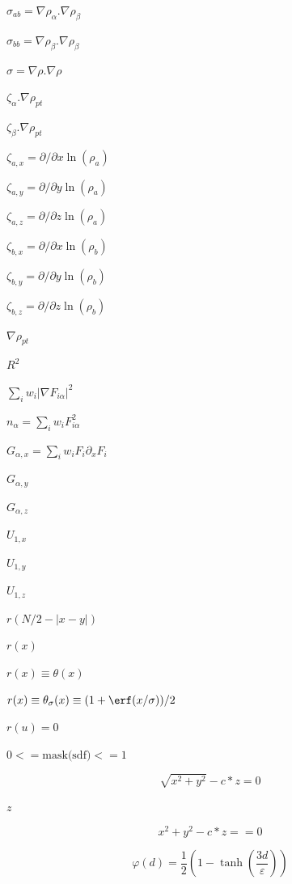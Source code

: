 \documentclass{article}
\begin{document}
$ \sigma_{ab} = \nabla \rho_{\alpha}.\nabla \rho_{\beta} $
\pagebreak

$ \sigma_{bb} = \nabla \rho_{\beta}.\nabla \rho_{\beta} $
\pagebreak

$ \sigma = \nabla \rho.\nabla \rho $
\pagebreak

$ \zeta_{\alpha}.\nabla\rho_{pt} $
\pagebreak

$ \zeta_{\beta}.\nabla\rho_{pt} $
\pagebreak

$ \zeta_{a,x}=\partial/{\partial x} \ln(\rho_a)  $
\pagebreak

$ \zeta_{a,y}=\partial/{\partial y} \ln(\rho_a)  $
\pagebreak

$ \zeta_{a,z}=\partial/{\partial z} \ln(\rho_a)  $
\pagebreak

$ \zeta_{b,x} = \partial/{\partial x} \ln(\rho_b)  $
\pagebreak

$ \zeta_{b,y} = \partial/{\partial y} \ln(\rho_b)  $
\pagebreak

$ \zeta_{b,z} = \partial/{\partial z} \ln(\rho_b)  $
\pagebreak

$ \nabla\rho_{pt}$
\pagebreak

$ R^2 $
\pagebreak

$ \sum_i w_i|\nabla F_{i\alpha}|^2 $
\pagebreak

$ n_\alpha=\sum_i w_iF_{i\alpha}^2 $
\pagebreak

$ G_{\alpha,x}=\sum_i w_iF_i\partial_xF_i $
\pagebreak

$ G_{\alpha,y} $
\pagebreak

$ G_{\alpha,z} $
\pagebreak

$ U_{1,x} $
\pagebreak

$ U_{1,y} $
\pagebreak

$ U_{1,z} $
\pagebreak

$ r(N/2 - |x-y|) $
\pagebreak

$ r(x) $
\pagebreak

$ r(x) \equiv \theta(x)$
\pagebreak

$ r(x) \equiv \theta_\sigma(x) \equiv (1 + \erf(x/\sigma))/2 $
\pagebreak

$r(u) = 0$
\pagebreak

$0 <=  \mbox{mask(sdf)} <= 1$
\pagebreak

\[ \sqrt{x^2 + y^2} - c * z = 0 \]
\pagebreak

$ z $
\pagebreak

\[ x^2 + y^2 - c * z == 0 \]
\pagebreak

\[ \varphi(d) = \frac{1}{2}\left( 1 - \tanh\left(
                     \frac{3d}{\varepsilon} \right) \right) \]
\pagebreak
\end{document}
